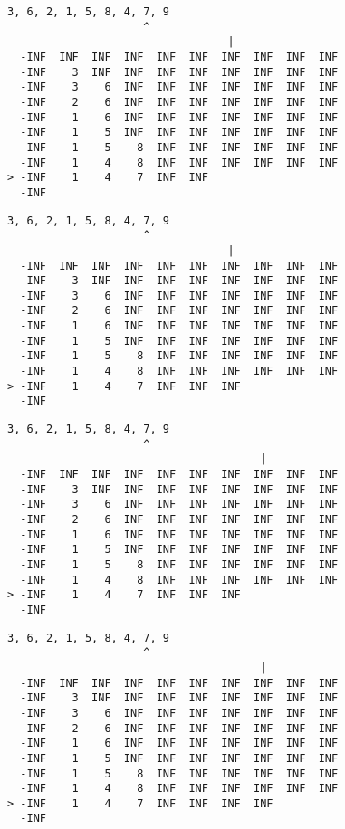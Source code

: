 { \begin{verbatim}
3, 6, 2, 1, 5, 8, 4, 7, 9
                     ^
                                  |
  -INF  INF  INF  INF  INF  INF  INF  INF  INF  INF
  -INF    3  INF  INF  INF  INF  INF  INF  INF  INF
  -INF    3    6  INF  INF  INF  INF  INF  INF  INF
  -INF    2    6  INF  INF  INF  INF  INF  INF  INF
  -INF    1    6  INF  INF  INF  INF  INF  INF  INF
  -INF    1    5  INF  INF  INF  INF  INF  INF  INF
  -INF    1    5    8  INF  INF  INF  INF  INF  INF
  -INF    1    4    8  INF  INF  INF  INF  INF  INF
> -INF    1    4    7  INF  INF                    
  -INF                                             
\end{verbatim} }

{ \begin{verbatim}
3, 6, 2, 1, 5, 8, 4, 7, 9
                     ^
                                  |
  -INF  INF  INF  INF  INF  INF  INF  INF  INF  INF
  -INF    3  INF  INF  INF  INF  INF  INF  INF  INF
  -INF    3    6  INF  INF  INF  INF  INF  INF  INF
  -INF    2    6  INF  INF  INF  INF  INF  INF  INF
  -INF    1    6  INF  INF  INF  INF  INF  INF  INF
  -INF    1    5  INF  INF  INF  INF  INF  INF  INF
  -INF    1    5    8  INF  INF  INF  INF  INF  INF
  -INF    1    4    8  INF  INF  INF  INF  INF  INF
> -INF    1    4    7  INF  INF  INF               
  -INF                                             
\end{verbatim} }

{ \begin{verbatim}
3, 6, 2, 1, 5, 8, 4, 7, 9
                     ^
                                       |
  -INF  INF  INF  INF  INF  INF  INF  INF  INF  INF
  -INF    3  INF  INF  INF  INF  INF  INF  INF  INF
  -INF    3    6  INF  INF  INF  INF  INF  INF  INF
  -INF    2    6  INF  INF  INF  INF  INF  INF  INF
  -INF    1    6  INF  INF  INF  INF  INF  INF  INF
  -INF    1    5  INF  INF  INF  INF  INF  INF  INF
  -INF    1    5    8  INF  INF  INF  INF  INF  INF
  -INF    1    4    8  INF  INF  INF  INF  INF  INF
> -INF    1    4    7  INF  INF  INF               
  -INF                                             
\end{verbatim} }

{ \begin{verbatim}
3, 6, 2, 1, 5, 8, 4, 7, 9
                     ^
                                       |
  -INF  INF  INF  INF  INF  INF  INF  INF  INF  INF
  -INF    3  INF  INF  INF  INF  INF  INF  INF  INF
  -INF    3    6  INF  INF  INF  INF  INF  INF  INF
  -INF    2    6  INF  INF  INF  INF  INF  INF  INF
  -INF    1    6  INF  INF  INF  INF  INF  INF  INF
  -INF    1    5  INF  INF  INF  INF  INF  INF  INF
  -INF    1    5    8  INF  INF  INF  INF  INF  INF
  -INF    1    4    8  INF  INF  INF  INF  INF  INF
> -INF    1    4    7  INF  INF  INF  INF          
  -INF                                             
\end{verbatim} }

